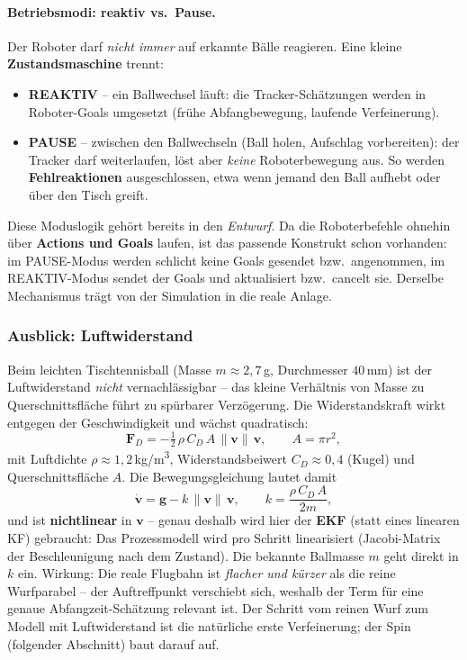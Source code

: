 \paragraph{Betriebsmodi: reaktiv vs.\ Pause.} Der Roboter darf \emph{nicht
immer} auf erkannte Bälle reagieren. Eine kleine \textbf{Zustandsmaschine} trennt:
\begin{itemize}
\item \textbf{REAKTIV} -- ein Ballwechsel läuft: die Tracker-Schätzungen werden in
  Roboter-Goals umgesetzt (frühe Abfangbewegung, laufende Verfeinerung).
\item \textbf{PAUSE} -- zwischen den Ballwechseln (Ball holen, Aufschlag
  vorbereiten): der Tracker darf weiterlaufen, löst aber \emph{keine}
  Roboterbewegung aus. So werden \textbf{Fehlreaktionen} ausgeschlossen, etwa wenn
  jemand den Ball aufhebt oder über den Tisch greift.
\end{itemize}
Diese Moduslogik gehört bereits in den \emph{Entwurf}. Da die Roboterbefehle
ohnehin über \textbf{Actions und Goals} laufen, ist das passende Konstrukt schon
vorhanden: im PAUSE-Modus werden schlicht keine Goals gesendet bzw.\ angenommen,
im REAKTIV-Modus sendet der  Goals und
aktualisiert bzw.\ cancelt sie. Derselbe Mechanismus trägt von der Simulation in
die reale Anlage.

\subsubsection{Ausblick: Luftwiderstand}
Beim leichten Tischtennisball (Masse $m\approx2{,}7\,$g, Durchmesser $40\,$mm)
ist der Luftwiderstand \emph{nicht} vernachlässigbar -- das kleine Verhältnis von
Masse zu Querschnittsfläche führt zu spürbarer Verzögerung. Die
Widerstandskraft wirkt entgegen der Geschwindigkeit und wächst quadratisch:
\begin{equation}
\mathbf{F}_D = -\tfrac{1}{2}\,\rho\,C_D\,A\,\lVert\mathbf{v}\rVert\,\mathbf{v},
\qquad A=\pi r^2,
\end{equation}
mit Luftdichte $\rho\approx1{,}2\,$kg/m\textsuperscript{3}, Widerstandsbeiwert
$C_D\approx0{,}4$ (Kugel) und Querschnittsfläche $A$. Die Bewegungsgleichung
lautet damit
\begin{equation}
\dot{\mathbf{v}} = \mathbf{g} - k\,\lVert\mathbf{v}\rVert\,\mathbf{v},
\qquad k=\frac{\rho\,C_D\,A}{2m},
\end{equation}
und ist \textbf{nichtlinear} in $\mathbf{v}$ -- genau deshalb wird hier der
\textbf{EKF} (statt eines linearen KF) gebraucht: Das Prozessmodell wird pro
Schritt linearisiert (Jacobi-Matrix der Beschleunigung nach dem Zustand). Die
bekannte Ballmasse $m$ geht direkt in $k$ ein. Wirkung: Die reale Flugbahn ist
\emph{flacher und kürzer} als die reine Wurfparabel -- der Auftreffpunkt
verschiebt sich, weshalb der Term für eine genaue Abfangzeit-Schätzung relevant
ist. Der Schritt vom reinen Wurf zum Modell mit Luftwiderstand ist die natürliche
erste Verfeinerung; der Spin (folgender Abschnitt) baut darauf auf.

